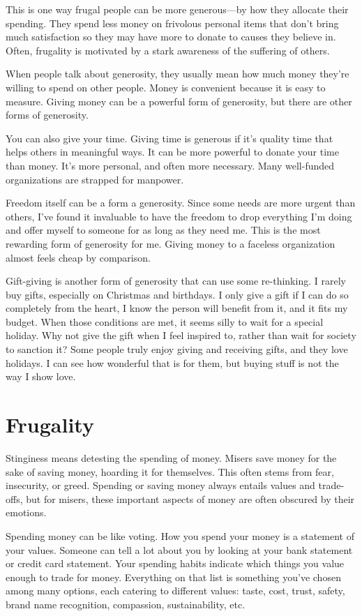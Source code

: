 This is one way frugal people can be more generous---by how they allocate their spending. They spend less money on frivolous personal items that don't bring much satisfaction so they may have more to donate to causes they believe in. Often, frugality is motivated by a stark awareness of the suffering of others.

When people talk about generosity, they usually mean how much money they're willing to spend on other people. Money is convenient because it is easy to measure. Giving money can be a powerful form of generosity, but there are other forms of generosity.

You can also give your time. Giving time is generous if it's quality time that helps others in meaningful ways. It can be more powerful to donate your time than money. It's more personal, and often more necessary. Many well-funded organizations are strapped for manpower. 

Freedom itself can be a form a generosity. Since some needs are more urgent than others, I've found it invaluable to have the freedom to drop everything I'm doing and offer myself to someone for as long as they need me. This is the most rewarding form of generosity for me. Giving money to a faceless organization almost feels cheap by comparison.

Gift-giving is another form of generosity that can use some re-thinking. I rarely buy gifts, especially on Christmas and birthdays. I only give a gift if I can do so completely from the heart, I know the person will benefit from it, and it fits my budget. When those conditions are met, it seems silly to wait for a special holiday. Why not give the gift when I feel inspired to, rather than wait for society to sanction it? Some people truly enjoy giving and receiving gifts, and they love holidays. I can see how wonderful that is for them, but buying stuff is not the way I show love.

\section{Frugality}
Stinginess means detesting the spending of money. Misers save money for the sake of saving money, hoarding it for themselves. This often stems from fear, insecurity, or greed. Spending or saving money always entails values and trade-offs, but for misers, these important aspects of money are often obscured by their emotions.

Spending money can be like voting. How you spend your money is a statement of your values. Someone can tell a lot about you by looking at your bank statement or credit card statement. Your spending habits indicate which things you value enough to trade for money. Everything on that list is something you've chosen among many options, each catering to different values: taste, cost, trust, safety, brand name recognition, compassion, sustainability, etc.

